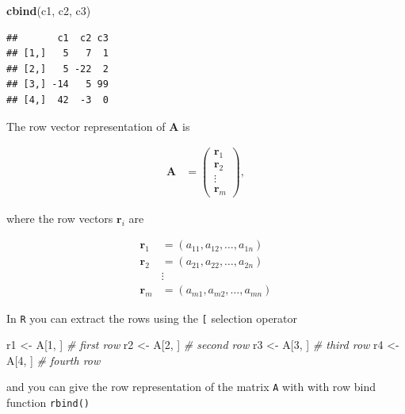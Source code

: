 \documentclass[
]{book}
\newenvironment{Shaded}{\begin{snugshade}}{\end{snugshade}}
\newcommand{\CommentTok}[1]{\textcolor[rgb]{0.56,0.35,0.01}{\textit{#1}}}
\newcommand{\DecValTok}[1]{\textcolor[rgb]{0.00,0.00,0.81}{#1}}
\newcommand{\KeywordTok}[1]{\textcolor[rgb]{0.13,0.29,0.53}{\textbf{#1}}}
\newcommand{\NormalTok}[1]{#1}
\newcommand{\StringTok}[1]{\textcolor[rgb]{0.31,0.60,0.02}{#1}}
\theoremstyle{definition}
\theoremstyle{definition}
\theoremstyle{definition}
\theoremstyle{definition}
\theoremstyle{remark}
\begin{document}
\begin{Shaded}
\begin{Highlighting}[]
\KeywordTok{cbind}\NormalTok{(c1, c2, c3)}
\end{Highlighting}
\end{Shaded}

\begin{verbatim}
##       c1  c2 c3
## [1,]   5   7  1
## [2,]   5 -22  2
## [3,] -14   5 99
## [4,]  42  -3  0
\end{verbatim}

The row vector representation of \(\mathbf{A}\) is

\[
\begin{aligned}
\mathbf{A} & = \begin{pmatrix} \mathbf{r}_{1} \\ \mathbf{r}_{2} \\ \vdots \\ \mathbf{r}_{m} \end{pmatrix},
\end{aligned}
\]

where the row vectors \(\mathbf{r}_i\) are

\[
\begin{aligned}
\mathbf{r}_1 & = \left( a_{11}, a_{12}, \ldots, a_{1n} \right) \\
\mathbf{r}_2 & = \left( a_{21}, a_{22}, \ldots, a_{2n} \right) \\
& \vdots \\
\mathbf{r}_m & = \left( a_{m1}, a_{m2}, \ldots, a_{mn} \right)
\end{aligned}
\]

In \texttt{R} you can extract the rows using the \texttt{{[}} selection operator

\begin{Shaded}
\begin{Highlighting}[]
\NormalTok{r1 <-}\StringTok{ }\NormalTok{A[}\DecValTok{1}\NormalTok{, ] }\CommentTok{# first row}
\NormalTok{r2 <-}\StringTok{ }\NormalTok{A[}\DecValTok{2}\NormalTok{, ] }\CommentTok{# second row}
\NormalTok{r3 <-}\StringTok{ }\NormalTok{A[}\DecValTok{3}\NormalTok{, ] }\CommentTok{# third row}
\NormalTok{r4 <-}\StringTok{ }\NormalTok{A[}\DecValTok{4}\NormalTok{, ] }\CommentTok{# fourth row}
\end{Highlighting}
\end{Shaded}

and you can give the row representation of the matrix \texttt{A} with with row bind function \texttt{rbind()}
\end{document}
